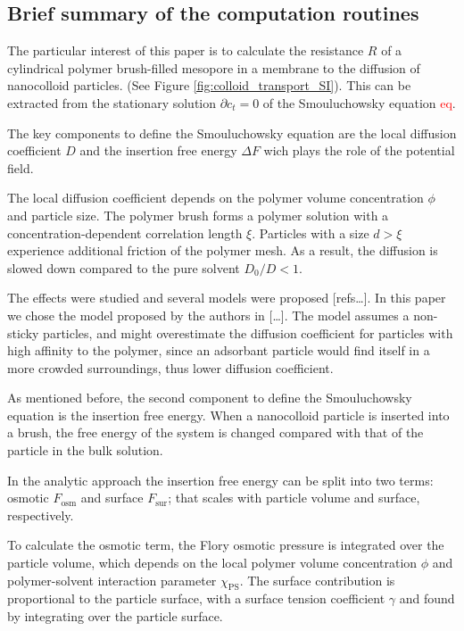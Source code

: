 \documentclass[10pt, a4paper]{article}
\newcommand\todo[1]{\textcolor{red}{#1}}
\begin{document}
\pagebreak
\subsection*{Brief summary of the computation routines}
\begin{multicols}{2}

The particular interest of this paper is to calculate the resistance $R$ of a cylindrical polymer brush-filled mesopore in a membrane to the diffusion of nanocolloid particles. (See Figure \ref{fig:colloid_transport_SI}).
This can be extracted from the stationary solution $\partial c_t = 0$ of the Smouluchowsky equation \todo{eq}. 

The key components to define the Smouluchowsky equation are the local diffusion coefficient $D$ and the insertion free energy $\Delta F$ wich plays the role of the potential field. 

The local diffusion coefficient depends on the polymer volume concentration $\phi$ and particle size. 
The polymer brush forms a polymer solution with a concentration-dependent correlation length $\xi$. 
Particles with a size $d>\xi$ experience additional friction of the polymer mesh. 
As a result, the diffusion is slowed down compared to the pure solvent $D_0/D<1$.

The effects were studied and several models were proposed [refs\dots]. 
In this paper we chose the model proposed by the authors in [\dots].
The model assumes a non-sticky particles, and might overestimate the diffusion coefficient for particles with high affinity to the polymer, since an adsorbant particle would find itself in a more crowded surroundings, thus lower diffusion coefficient.

As mentioned before, the second component to define the Smouluchowsky equation is the insertion free energy. 
When a nanocolloid particle is inserted into a brush, the free energy of the system is changed compared with that of the particle in the bulk solution. 

In the analytic approach the insertion free energy can be split into two terms: osmotic $F_{\textrm{osm}}$ and surface $F_{\textrm{sur}}$; that scales with particle volume and surface, respectively.

To calculate the osmotic term, the Flory osmotic pressure is integrated over the particle volume, which depends on the local polymer volume concentration $\phi$ and polymer-solvent interaction parameter $\chi_{\textrm{PS}}$.
The surface contribution is proportional to the particle surface, with a surface tension coefficient $\gamma$ and found by integrating over the particle surface.


\end{multicols}
\end{document}

